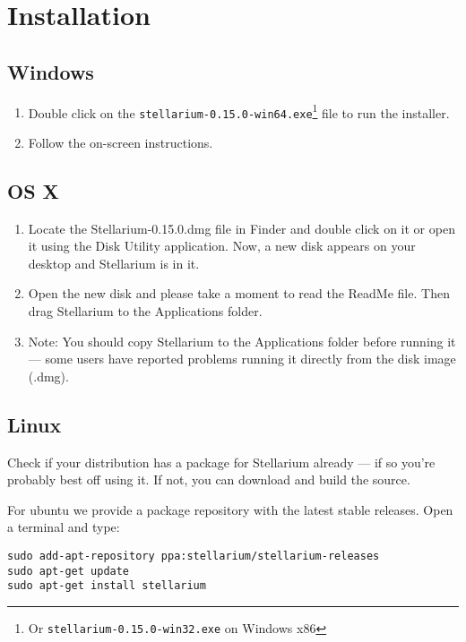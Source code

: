 \section{Installation}

\subsection{Windows}

\begin{enumerate}
\item
  Double click on the \texttt{stellarium-0.15.0-win64.exe}\footnote{Or
    \texttt{stellarium-0.15.0-win32.exe} on Windows x86} file to run the
  installer.
\item
  Follow the on-screen instructions.
\end{enumerate}

\subsection{OS X}

\begin{enumerate}
\item
  Locate the Stellarium-0.15.0.dmg file in
  Finder and double click on it or open it using the Disk Utility
  application. Now, a new disk appears on your desktop and Stellarium is
  in it.
\item
  Open the new disk and please take a moment to read the ReadMe file.
  Then drag Stellarium to the Applications folder.
\item
  Note: You should copy Stellarium to the Applications folder before
  running it --- some users have reported problems running it directly
  from the disk image (.dmg).
\end{enumerate}

\subsection{Linux}

Check if your distribution has a package for Stellarium already --- if
so you're probably best off using it. If not, you can download and build
the source.

For ubuntu we provide a package repository with the latest stable
releases. Open a terminal and type:

\begin{config}
\texttt{sudo~add-apt-repository~ppa:stellarium/stellarium-releases}\\
\texttt{sudo~apt-get~update}\\
\texttt{sudo~apt-get~install~stellarium}
\end{config}

